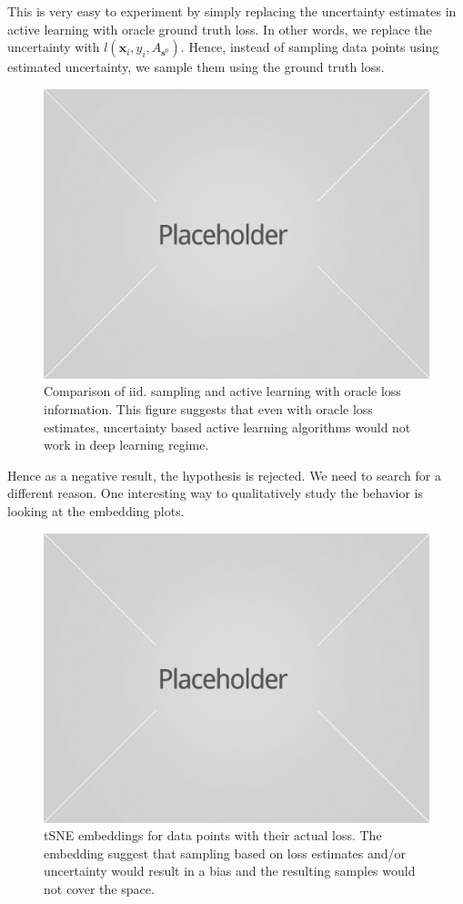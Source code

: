 \documentclass{article}
\begin{document}
This is very easy to experiment by simply replacing the uncertainty estimates in active learning with oracle ground truth loss. In other words, we replace the uncertainty with $l(\mathbf{x}_i,y_i,A_{\mathbf{s}^0})$. Hence, instead of sampling data points using estimated uncertainty, we sample them using the ground truth loss.

\begin{figure}[ht]
\includegraphics[width=\columnwidth]{placeholder1.jpg}
\caption{Comparison of iid. sampling and active learning with oracle loss information. This figure suggests that even with oracle loss estimates, uncertainty based active learning algorithms would not work in deep learning regime.}
\end{figure}

Hence as a negative result, the hypothesis is rejected. We need to search for a different reason. One interesting way to qualitatively study the behavior is looking at the embedding plots.

\begin{figure}[ht]
\includegraphics[width=\columnwidth]{placeholder1.jpg}
\caption{tSNE embeddings for data points with their actual loss. The embedding suggest that sampling based on loss estimates and/or uncertainty would result in a bias and the resulting samples would not cover the space.}
\end{figure}
\end{document}
